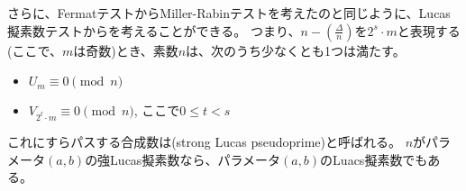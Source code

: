 さらに、FermatテストからMiller-Rabinテストを考えたのと同じように、Lucas擬素数テストからを考えることができる。
つまり、$n - \left(\frac{\Delta}{n}\right)$を$2^s\cdot m$と表現する(ここで、$m$は奇数)とき、素数$n$は、次のうち少なくとも1つは満たす。
\begin{itemize}
 \item $U_m \equiv 0 \pmod{n}$
 \item $V_{2^t\cdot m} \equiv 0 \pmod{n}$, ここで$0\le t<s$
\end{itemize}
これにすらパスする合成数は(strong Lucas pseudoprime)と呼ばれる。
$n$がパラメータ$(a,b)$の強Lucas擬素数なら、パラメータ$(a,b)$のLuacs擬素数でもある。



